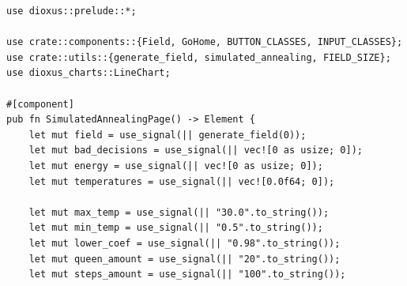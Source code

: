 \documentclass[a4paper,14pt]{extarticle}
\begin{document}
\begin{verbatim}
use dioxus::prelude::*;

use crate::components::{Field, GoHome, BUTTON_CLASSES, INPUT_CLASSES};
use crate::utils::{generate_field, simulated_annealing, FIELD_SIZE};
use dioxus_charts::LineChart;

#[component]
pub fn SimulatedAnnealingPage() -> Element {
    let mut field = use_signal(|| generate_field(0));
    let mut bad_decisions = use_signal(|| vec![0 as usize; 0]);
    let mut energy = use_signal(|| vec![0 as usize; 0]);
    let mut temperatures = use_signal(|| vec![0.0f64; 0]);

    let mut max_temp = use_signal(|| "30.0".to_string());
    let mut min_temp = use_signal(|| "0.5".to_string());
    let mut lower_coef = use_signal(|| "0.98".to_string());
    let mut queen_amount = use_signal(|| "20".to_string());
    let mut steps_amount = use_signal(|| "100".to_string());


\end{verbatim}
\end{document}
